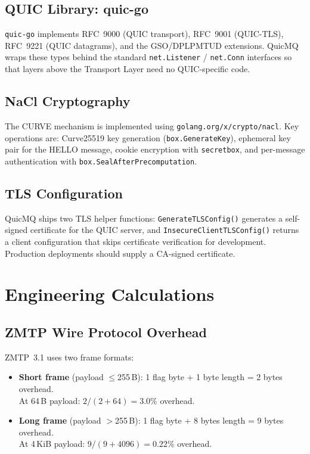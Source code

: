 \documentclass[12pt, a4paper, oneside]{report}
\begin{document}
\subsection{QUIC Library: quic-go}
\texttt{quic-go} \cite{quicgo} implements RFC~9000 (QUIC transport), RFC~9001 (QUIC-TLS), RFC~9221 (QUIC datagrams), and the GSO/DPLPMTUD extensions. QuicMQ wraps these types behind the standard \texttt{net.Listener} / \texttt{net.Conn} interfaces so that layers above the Transport Layer need no QUIC-specific code.

\subsection{NaCl Cryptography}
The CURVE mechanism is implemented using \texttt{golang.org/x/crypto/nacl}. Key operations are: Curve25519 key generation (\texttt{box.GenerateKey}), ephemeral key pair for the HELLO message, cookie encryption with \texttt{secretbox}, and per-message authentication with \texttt{box.SealAfterPrecomputation}.

\subsection{TLS Configuration}
QuicMQ ships two TLS helper functions: \texttt{GenerateTLSConfig()} generates a self-signed certificate for the QUIC server, and \texttt{InsecureClientTLSConfig()} returns a client configuration that skips certificate verification for development. Production deployments should supply a CA-signed certificate.

\section{Engineering Calculations}
\label{sec:calc}

\subsection{ZMTP Wire Protocol Overhead}
ZMTP~3.1 uses two frame formats:
\begin{itemize}
  \item \textbf{Short frame} (payload $\leq$255\,B): 1 flag byte + 1 byte length = 2 bytes overhead.\\
    At 64\,B payload: $2/(2+64) = 3.0\%$ overhead.
  \item \textbf{Long frame} (payload $>$255\,B): 1 flag byte + 8 bytes length = 9 bytes overhead.\\
    At 4\,KiB payload: $9/(9+4096) = 0.22\%$ overhead.
\end{itemize}
\end{document}
